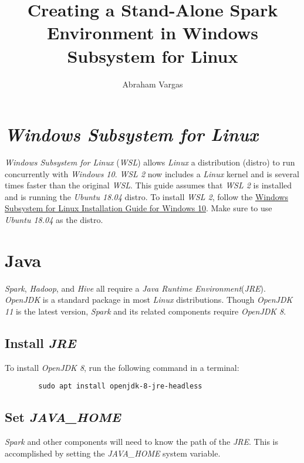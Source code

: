 \documentclass{article}
\begin{document}
\title{Creating a Stand-Alone Spark Environment in Windows Subsystem for Linux}
\author{Abraham Vargas}
\maketitle

\newpage
\tableofcontents
\newpage

\section{\emph{Windows Subsystem for Linux}}
\emph{Windows Subsystem for Linux} (\emph{WSL}) allows \emph{Linux} a distribution (distro) to
run concurrently with \emph{Windows 10}. \emph{WSL 2} now includes a \emph{Linux}
kernel and is several times faster than the original \emph{WSL}. This guide assumes that \emph{WSL 2}
is installed and is running the \emph{Ubuntu 18.04} distro. To install \emph{WSL 2}, follow the
\href{https://docs.microsoft.com/en-us/windows/wsl/install-win10}{Windows Subsystem for Linux Installation Guide for Windows 10}.
Make sure to use \emph{Ubuntu 18.04} as the distro.

\section{Java}
\emph{Spark}, \emph{Hadoop}, and \emph{Hive} all require a \emph{Java Runtime Environment}(\emph{JRE}).
\emph{OpenJDK} is a standard package in most \emph{Linux} distributions. Though \emph{OpenJDK 11}
is the latest version, \emph{Spark} and its related components require \emph{OpenJDK 8}.

    \subsection{Install \emph{JRE}}
    To install \emph{OpenJDK 8}, run the following command in a terminal:
    \begin{verbatim}
        sudo apt install openjdk-8-jre-headless            
    \end{verbatim}

    \subsection{Set \emph{JAVA\_HOME}}
    \label{sec:javahome}
    \emph{Spark} and other components will need to know the path of the
    \emph{JRE}. This is accomplished by setting the \emph{JAVA\_HOME}
    system variable.
\end{document}
